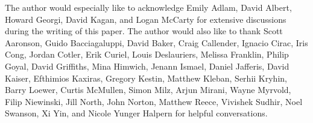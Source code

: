 \documentclass[12pt,english,prl,superscriptaddress,nobibnotes,nofootinbib]{revtex4-2}
\begin{document}
The author would especially like to acknowledge Emily Adlam, David
Albert, Howard Georgi, David Kagan, and Logan McCarty for extensive
discussions during the writing of this paper. The author would also
like to thank Scott Aaronson, Guido Bacciagaluppi, David Baker, Craig
Callender, Ignacio Cirac, Iris Cong, Jordan Cotler, Erik Curiel, Louis
Deslauriers, Melissa Franklin, Philip Goyal, David Griffiths, Mina
Himwich, Jenann Ismael, Daniel Jafferis, David Kaiser, Efthimios Kaxiras,
Gregory Kestin, Matthew Kleban, Serhii Kryhin, Barry Loewer, Curtis
McMullen, Simon Milz, Arjun Mirani, Wayne Myrvold, Filip Niewinski,
Jill North, John Norton, Matthew Reece, Vivishek Sudhir, Noel Swanson,
Xi Yin, and Nicole Yunger Halpern for helpful conversations.

\newpage
\raggedright


\end{document}
